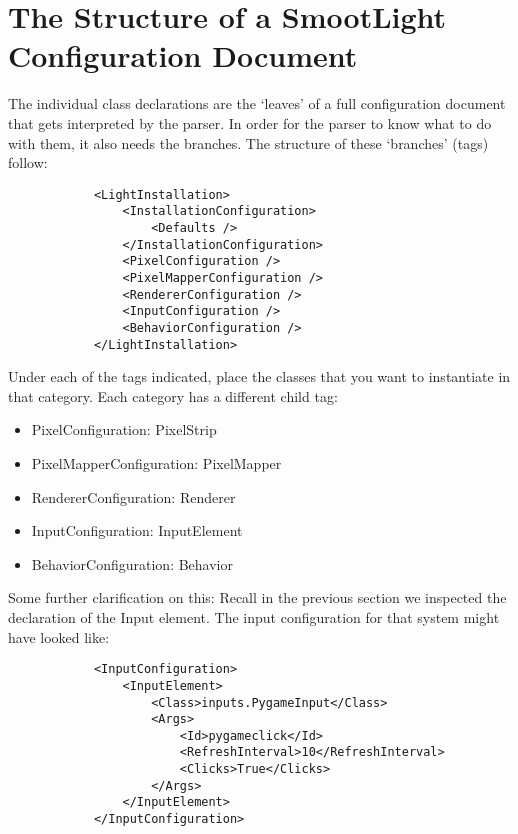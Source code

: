 \documentclass{article}
\begin{document}
    \section{The Structure of a SmootLight Configuration Document}
        The individual class declarations are the `leaves' of a full configuration document that
        gets interpreted by the parser.  In order for the parser to know what to do with them, it
        also needs the branches.  The structure of these `branches' (tags) follow:
        \begin{verbatim}
            <LightInstallation>
                <InstallationConfiguration>
                    <Defaults />
                </InstallationConfiguration>
                <PixelConfiguration />
                <PixelMapperConfiguration />
                <RendererConfiguration />
                <InputConfiguration />
                <BehaviorConfiguration />
            </LightInstallation>
        \end{verbatim}
        Under each of the tags indicated, place the classes that you want to instantiate in that
        category.  Each category has a different child tag:
        \begin{itemize}
            \item PixelConfiguration: PixelStrip
            \item PixelMapperConfiguration: PixelMapper
            \item RendererConfiguration: Renderer
            \item InputConfiguration: InputElement
            \item BehaviorConfiguration: Behavior
        \end{itemize}
        Some further clarification on this: Recall in the previous section we inspected the
        declaration of the Input element.  The input configuration for that system might have looked
        like:
        \begin{verbatim}
            <InputConfiguration> 
                <InputElement>
                    <Class>inputs.PygameInput</Class>
                    <Args>
                        <Id>pygameclick</Id>
                        <RefreshInterval>10</RefreshInterval>
                        <Clicks>True</Clicks>
                    </Args>
                </InputElement>
            </InputConfiguration>
        \end{verbatim}
\end{document}

